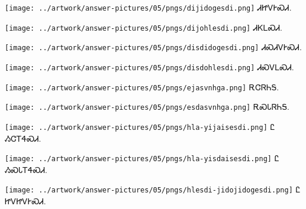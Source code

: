 \documentclass[avery5371,frame]{flashcards}%
\begin{document}
\begin{flashcard}{
\texttt{[image: ../artwork/answer-pictures/05/pngs/dijidogesdi.png]}
}\Huge ᏗᏥᏙᎨᏍᏗ.
\end{flashcard}

\begin{flashcard}{
\texttt{[image: ../artwork/answer-pictures/05/pngs/dijohlesdi.png]}
}\Huge ᏗᏦᏞᏍᏗ.
\end{flashcard}

\begin{flashcard}{
\texttt{[image: ../artwork/answer-pictures/05/pngs/disdidogesdi.png]}
}\Huge ᏗᏍᏗᏙᎨᏍᏗ.
\end{flashcard}

\begin{flashcard}{
\texttt{[image: ../artwork/answer-pictures/05/pngs/disdohlesdi.png]}
}\Huge ᏗᏍᏙᏞᏍᏗ.
\end{flashcard}

\begin{flashcard}{
\texttt{[image: ../artwork/answer-pictures/05/pngs/ejasvnhga.png]}
}\Huge ᎡᏣᏒᏂᎦ.
\end{flashcard}

\begin{flashcard}{
\texttt{[image: ../artwork/answer-pictures/05/pngs/esdasvnhga.png]}
}\Huge ᎡᏍᏓᏒᏂᎦ.
\end{flashcard}

\begin{flashcard}{
\texttt{[image: ../artwork/answer-pictures/05/pngs/hla-yijaisesdi.png]}
}\Huge Ꮭ ᏱᏣᎢᏎᏍᏗ.
\end{flashcard}

\begin{flashcard}{
\texttt{[image: ../artwork/answer-pictures/05/pngs/hla-yisdaisesdi.png]}
}\Huge Ꮭ ᏱᏍᏓᎢᏎᏍᏗ.
\end{flashcard}

\begin{flashcard}{
\texttt{[image: ../artwork/answer-pictures/05/pngs/hlesdi-jidojidogesdi.png]}
}\Huge Ꮭ ᏥᏙᏥᏙᎨᏍᏗ.
\end{flashcard}
\end{document}
